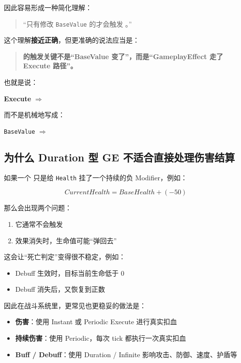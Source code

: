 \documentclass[10pt,CJKmath]{ctexart}
\begin{document}
因此容易形成一种简化理解：

\begin{quote}
	“只有修改 \verb|BaseValue| 的才会触发 。”
\end{quote}

这个理解\textbf{接近正确}，但更准确的说法应当是：

\begin{quote}
	\textbf{ 的触发关键不是“BaseValue 变了”，而是“GameplayEffect 走了 Execute 路径”。}
\end{quote}

也就是说：

\begin{center}
	\textbf{Execute} $\Rightarrow$ 
\end{center}

而不是机械地写成：

\begin{center}
	\verb|BaseValue|  $\Rightarrow$ 
\end{center}

\subsection{为什么 Duration 型 GE 不适合直接处理伤害结算}

如果一个  只是给 \verb|Health| 挂了一个持续的负 Modifier，例如：

\[
CurrentHealth = BaseHealth + (-50)
\]

那么会出现两个问题：

\begin{enumerate}
	\item 它通常不会触发 
	\item 效果消失时，生命值可能“弹回去”
\end{enumerate}

这会让“死亡判定”变得很不稳定，例如：

\begin{itemize}
	\item Debuff 生效时，目标当前生命低于 0
	\item Debuff 消失后，又恢复到正数
\end{itemize}

因此在战斗系统里，更常见也更稳妥的做法是：

\begin{itemize}
	\item \textbf{伤害}：使用 Instant 或 Periodic Execute 进行真实扣血
	\item \textbf{持续伤害}：使用 Periodic，每次 tick 都执行一次真实扣血
	\item \textbf{Buff / Debuff}：使用 Duration / Infinite 影响攻击、防御、速度、护盾等
\end{itemize}
\end{document}
